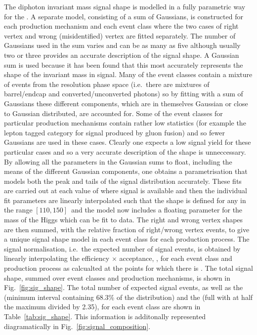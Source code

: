 The diphoton invariant mass signal shape is modelled in a fully parametric way for the \MFM. A separate model, consisting of a sum of Gaussians, is constructed for each production mechanism and each event class where the two cases of right vertex and wrong (misidentified) vertex are fitted separately. The number of Gaussians used in the sum varies and can be as many as five although usually two or three provides an accurate description of the signal shape. A Gaussian sum is used because it has been found that this most accurately represents the shape of the invariant mass in signal. Many of the event classes contain a mixture of events from the resolution phase space (i.e.~there are mixtures of barrel/endcap and converted/unconverted photons) so by fitting with a sum of Gaussians these different components, which are in themselves Gaussian or close to Gaussian distributed, are accounted for. Some of the event classes for particular production mechanisms contain rather low \MC statistics (for example the lepton tagged category for signal produced by gluon fusion) and so fewer Gaussians are used in these cases. Clearly one expects a low signal yield for these particular cases and so a very accurate description of the shape is unneccessary. By allowing all the parameters in the Gaussian sums to float, including the means of the different Gaussian components, one obtains a parametrisation that models both the peak and tails of the signal distribution accurately. These fits are carried out at each value of \mH where signal \MC is available and then the individual fit parameters are linearly interpolated such that the shape is defined for any \mH in the range $[110,150]$~\GeV and the model now includes a floating parameter for the mass of the Higgs which can be fit to data. The right and wrong vertex shapes are then summed, with the relative fraction of right/wrong vertex events, to give a unique signal shape model in each event class for each production process. The signal normalisation, i.e.~the expected number of \SM signal events, is obtained by linearly interpolating the efficiency $\times$ acceptance, \ea, for each event class and production process as calcualted at the \mH points for which there is \MC. The total signal shape, summed over event classes and production mechanisms, is shown in Fig.~\ref{fig:sig_shape}. The total number of expected signal events, as well as the \sigeff (minimum interval containing 68.3\% of the distribution) and the \sigFW (full with at half the maximum divided by 2.35), for each event class are shown in Table~\ref{tab:sig_shape}. This information is additonally represented diagramatically in Fig.~\ref{fig:signal_composition}.

